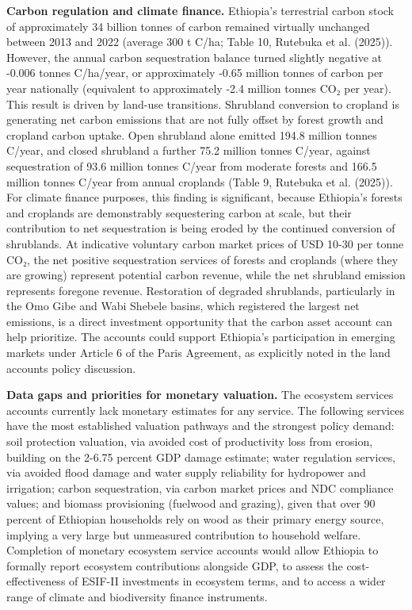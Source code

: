 \documentclass[
  letterpaper,
  DIV=11,
  numbers=noendperiod]{scrartcl}
\begin{document}
\textbf{Carbon regulation and climate finance.} Ethiopia's terrestrial
carbon stock of approximately 34 billion tonnes of carbon remained
virtually unchanged between 2013 and 2022 (average 300 t C/ha; Table 10,
Rutebuka et al. (2025)). However, the annual carbon sequestration
balance turned slightly negative at -0.006 tonnes C/ha/year, or
approximately -0.65 million tonnes of carbon per year nationally
(equivalent to approximately -2.4 million tonnes CO₂ per year). This
result is driven by land-use transitions. Shrubland conversion to
cropland is generating net carbon emissions that are not fully offset by
forest growth and cropland carbon uptake. Open shrubland alone emitted
194.8 million tonnes C/year, and closed shrubland a further 75.2 million
tonnes C/year, against sequestration of 93.6 million tonnes C/year from
moderate forests and 166.5 million tonnes C/year from annual croplands
(Table 9, Rutebuka et al. (2025)). For climate finance purposes, this
finding is significant, because Ethiopia's forests and croplands are
demonstrably sequestering carbon at scale, but their contribution to net
sequestration is being eroded by the continued conversion of shrublands.
At indicative voluntary carbon market prices of USD 10-30 per tonne CO₂,
the net positive sequestration services of forests and croplands (where
they are growing) represent potential carbon revenue, while the net
shrubland emission represents foregone revenue. Restoration of degraded
shrublands, particularly in the Omo Gibe and Wabi Shebele basins, which
registered the largest net emissions, is a direct investment opportunity
that the carbon asset account can help prioritize. The accounts could
support Ethiopia's participation in emerging markets under Article 6 of
the Paris Agreement, as explicitly noted in the land accounts policy
discussion.

\textbf{Data gaps and priorities for monetary valuation.} The ecosystem
services accounts currently lack monetary estimates for any service. The
following services have the most established valuation pathways and the
strongest policy demand: soil protection valuation, via avoided cost of
productivity loss from erosion, building on the 2-6.75 percent GDP
damage estimate; water regulation services, via avoided flood damage and
water supply reliability for hydropower and irrigation; carbon
sequestration, via carbon market prices and NDC compliance values; and
biomass provisioning (fuelwood and grazing), given that over 90 percent
of Ethiopian households rely on wood as their primary energy source,
implying a very large but unmeasured contribution to household welfare.
Completion of monetary ecosystem service accounts would allow Ethiopia
to formally report ecosystem contributions alongside GDP, to assess the
cost-effectiveness of ESIF-II investments in ecosystem terms, and to
access a wider range of climate and biodiversity finance instruments.
\end{document}

